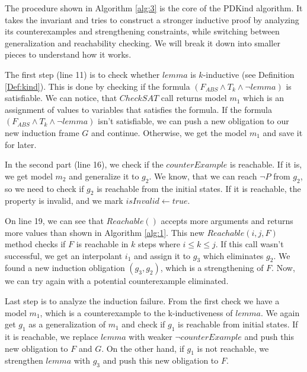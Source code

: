 The procedure shown in Algorithm \ref{alg:3} is the core of the PDKind algorithm.
It takes the invariant and tries to construct a stronger inductive proof by analyzing its counterexamples and strengthening constraints, while switching between \\
generalization and reachability checking.
We will break it down into smaller pieces to understand how it works.


The first step (line 11) is to check whether \( lemma \) is
\( k \)-inductive (see Definition \ref{Def:kind}). This is done by checking if the formula $(F_{ABS} \wedge T_k
\wedge \neg lemma)$ is satisfiable. We can notice, that \( CheckSAT \) call returns model $m_1$ which
is an assignment of values to variables that satisfies the formula.
If the formula $(F_{ABS} \wedge T_k \wedge \neg lemma)$ isn't satisfiable, we
can push a new obligation to our new induction frame \( G \) and continue.
Otherwise, we get the model $m_1$ and save it for later.

In the second part (line 16), we check if the \( counterExample \) is
reachable. If it is, we get model $m_2$ and generalize it to
$g_2$. We know, that we can reach \( \neg P \) from $g_2$,
so we need to check if $g_2$ is reachable from the initial states. If it is
reachable, the property is invalid, and we mark \( isInvalid \gets true \).


On line 19, we can see that \( Reachable() \) accepts more arguments and
returns more values than shown in Algorithm
\ref{alg:1}. This new
$Reachable(i,j,F)$ method checks if $F$ is reachable in \( k \) steps
where $i\leq k \leq j$.
If this call wasn't successful, we get an interpolant $i_1$ and assign
it to $g_3$ which eliminates $g_2$. We found a new induction
obligation $(g_3, g_2)$, which is a strengthening of \( F \). Now,
we can try again with a potential counterexample eliminated.

Last step is to analyze the induction failure. From the first check we have a
model $m_1$, which is a counterexample to the k-inductiveness of
\( lemma \). We again get $g_1$ as a generalization of $m_1$
and check if $g_1$ is reachable from initial states. If it is
reachable, we replace \( lemma \) with weaker \( \neg counterExample \)
and push this new obligation to \( F \) and \( G \). On the other hand,
if $g_1$ is not reachable, we strengthen \( lemma \) with
$g_3$ and push this new obligation to \( F \).

